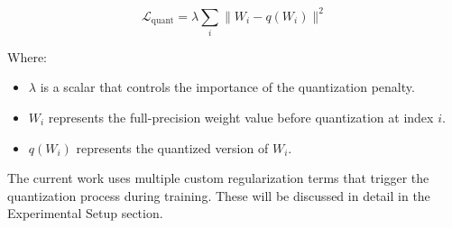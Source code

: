 \[
\mathcal{L}_{\text{quant}} = \lambda \sum_{i} \| W_i - q(W_i) \|^2
\]

\noindent Where:
\begin{itemize}
    \item \( \lambda \) is a scalar that controls the importance of the quantization penalty.
    \item \( W_i \) represents the full-precision weight value before quantization at index \( i \).
    \item \( q(W_i) \) represents the quantized version of \( W_i \).
\end{itemize}

\noindent The current work uses multiple custom regularization terms that trigger the quantization process during training. 
These will be discussed in detail in the Experimental Setup section.
